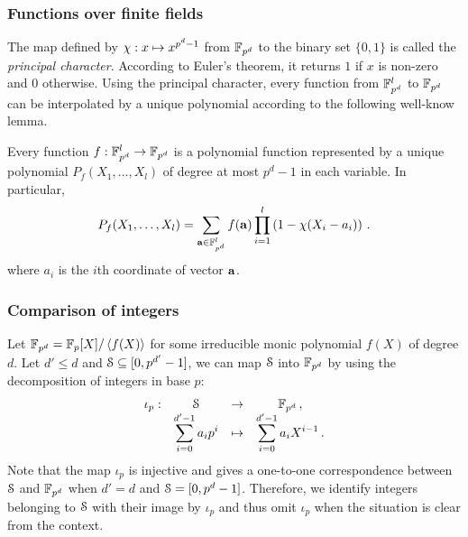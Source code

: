 \subsubsection{Functions over finite fields}\label{subsec:funcff}
The map defined by $\princhar: x \mapsto x^{p^d-1}$ from $\F_{p^d}$ to the binary set $\{0,1\}$ is called the \emph{principal character}. 
According to Euler's theorem, it returns $1$ if $x$ is non-zero and $0$ otherwise. 
Using the principal character, every function from $\F_{p^d}^l$ to $\F_{p^d}$ can be interpolated by a unique polynomial according to the following well-know lemma. 
\begin{lemma}\label{lem:interpolation}
  Every function $f: \F_{p^d}^l \rightarrow \F_{p^d}$ is a polynomial function represented by a unique polynomial $P_f(X_1,\dots,X_{l})$ of degree at most $p^d - 1$ in each variable.
  In particular,
  \begin{align*}
    P_f(X_1,\dots,X_{l}) = \sum_{\va \in \F^l_{p^d}} f(\va) \prod_{i=1}^{l} \left(1 - \princhar(X_i - a_i)\right)\,.
  \end{align*}
  where $a_i$ is the $i$th coordinate of vector $\va$. 
\end{lemma}

\subsubsection{Comparison of integers}
  Let $\F_{p^d} = \F_p[X]/\ideal{f(X)}$ for some irreducible monic polynomial $f(X)$ of degree $d$.
  Let $d'\leq d$ and $\S \subseteq [0,p^{d'}-1]$, we can map $\S$ into $\F_{p^d}$ by using the decomposition of integers in base $p$:
  $$\begin{array}{cccc}
      \iota_p : & \S & \rightarrow & \F_{p^d}\,, \\
              & \displaystyle\sum_{i=0}^{d'-1}a_ip^i & \mapsto & \displaystyle\sum_{i=0}^{d'-1}a_i X^{i-1}\,. 
    \end{array}$$
  Note that the map $\iota_p$ is injective and gives a one-to-one correspondence between $\S$ and $\F_{p^{d}}$ when $d'=d$ and $\S = [0,p^d-1]$. 
  Therefore, we identify integers belonging to $\S$ with their image by $\iota_p$ and thus omit $\iota_p$ when the situation is clear from the context.

